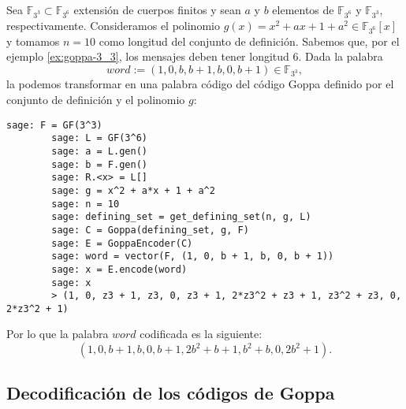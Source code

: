\begin{exampleth}
    \label{ex:goppa-encode}
    Sea $\mathbb{F}_{3^3} \subset \mathbb{F}_{3^6}$ extensión de cuerpos finitos y sean $a$ y $b$ elementos de $\mathbb{F}_{3^6}$ y $\mathbb{F}_{3^3}$, respectivamente. Consideramos el polinomio $g(x) = x^2 + ax + 1 + a^2 \in \mathbb{F}_{3^6}[x]$ y tomamos $n = 10$ como longitud del conjunto de definición. Sabemos que, por el ejemplo \ref{ex:goppa-3_3}, los mensajes deben tener longitud $6$. Dada la palabra
    \[
        word := (1, 0, b, b + 1, b, 0, b + 1) \in \mathbb{F}_{3^3},
    \]
    la podemos transformar en una palabra código del código Goppa definido por el conjunto de definición y el polinomio $g$:

    \begin{lstlisting}[gobble=4]
        sage: F = GF(3^3)
        sage: L = GF(3^6)
        sage: a = L.gen()
        sage: b = F.gen()
        sage: R.<x> = L[]
        sage: g = x^2 + a*x + 1 + a^2
        sage: n = 10
        sage: defining_set = get_defining_set(n, g, L)
        sage: C = Goppa(defining_set, g, F)
        sage: E = GoppaEncoder(C)
        sage: word = vector(F, (1, 0, b + 1, b, 0, b + 1))
        sage: x = E.encode(word)
        sage: x
        > (1, 0, z3 + 1, z3, 0, z3 + 1, 2*z3^2 + z3 + 1, z3^2 + z3, 0, 2*z3^2 + 1)
    \end{lstlisting}

    Por lo que la palabra $word$ codificada es la siguiente:
    \[
        (1, 0, b + 1, b, 0, b + 1, 2b^2 + b + 1, b^2 + b, 0, 2b^2 + 1).
    \]
\end{exampleth}

\subsection{Decodificación de los códigos de Goppa}

